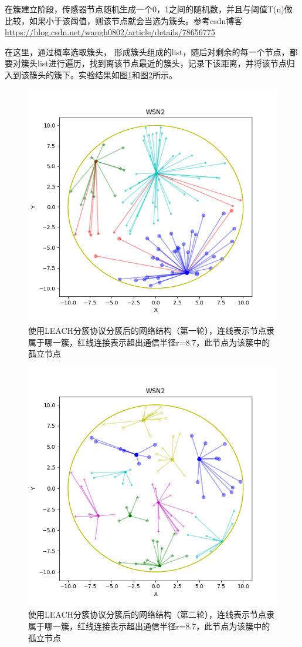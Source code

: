 \documentclass[UTF8]{article} %
\begin{document}
	 在簇建立阶段，传感器节点随机生成一个0，1之间的随机数，并且与阈值T(n)做比较，如果小于该阈值，则该节点就会当选为簇头。参考csdn博客\url{https://blog.csdn.net/wangh0802/article/details/78656775}
	 
	 在这里，通过概率选取簇头， 形成簇头组成的list，随后对剩余的每一个节点，都要对簇头list进行遍历，找到离该节点最近的簇头，记录下该距离，并将该节点归入到该簇头的簇下。实验结果如图\ref{fig:figure2}和图\ref{fig:figure4}所示。
	 
	 \begin{figure}[H]
	 	\centering
	 	\includegraphics[width=0.65\linewidth]{Figure_2}
	 	\caption{使用LEACH分簇协议分簇后的网络结构（第一轮），连线表示节点隶属于哪一簇，红线连接表示超出通信半径r=8.7，此节点为该簇中的孤立节点}
	 	\label{fig:figure2}
	 \end{figure}
 
	 \begin{figure}[H]
	 	\centering
	 	\includegraphics[width=0.65\linewidth]{Figure_4}
	 	\caption{使用LEACH分簇协议分簇后的网络结构（第二轮），连线表示节点隶属于哪一簇，红线连接表示超出通信半径r=8.7，此节点为该簇中的孤立节点}
	 	\label{fig:figure4}
	 \end{figure}
 
\end{document}
